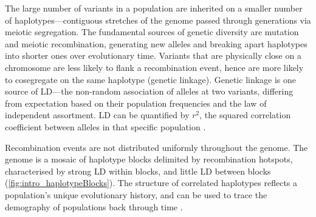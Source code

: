 \begin{outline}
The large number of variants in a population are inherited on a smaller number of haplotypes---contiguous stretches of the genome passed through generations via meiotic segregation.
The fundamental sources of genetic diversity are mutation and meiotic recombination, generating new alleles and breaking apart haplotypes into shorter ones over evolutionary time.
Variants that are physically close on a chromosome are less likely to flank a recombination event, hence are more likely to cosegregate on the same haplotype (genetic linkage).
Genetic linkage is one source of \gls{LD}---the non-random association of alleles at two variants, differing from expectation based on their population frequencies and the law of independent assortment.
\gls{LD} can be quantified by $r^2$, the squared correlation coefficient between alleles in that specific population \autocite{slatkin2008LinkageDisequilibriumUnderstanding}.

Recombination events are not distributed uniformly throughout the genome.
The genome is a mosaic of haplotype blocks delimited by recombination hotspots, 
characterised by strong \gls{LD} within blocks, and little \gls{LD} between blocks \autocite{wall2003HaplotypeBlocksLinkage,theinternationalhapmapconsortium2007SecondGenerationHuman} (\cref{fig:intro_haplotypeBlocks}).
The structure of correlated haplotypes reflects a population's unique evolutionary history, and can be used to trace the demography of populations back through time \autocite{karczewski2020AnalyticTranslationalGenetics}.


\end{outline}

